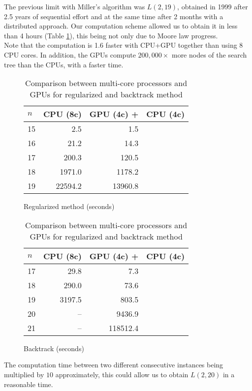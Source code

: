 The previous limit with Miller's algorithm was $L(2,19)$, obtained in 1999 after 2.5 years of sequential effort and at the same time after 2 months with a distributed approach\cite{Mil00}. 
Our computation scheme allowed us to obtain it in less than 4 hours (Table \ref{tab:result_base_regu}), this being not only due to Moore law progress.\\
Note that the computation is 1.6 faster with CPU+GPU together than using 8 CPU cores. 
In addition, the GPUs compute $200,000\times$ more nodes of the search tree than the CPUs, with a faster time.

\begin{table}[t!]
\begin{subfigure}[b]{0.5\linewidth}
\centering
\begin{tabular}{l r r r}
					\hline
					$n$ & CPU (8c) &  GPU (4c) +  &  \hspace*{-.8em}CPU (4c) \\
					\hline
					\hline
					15	& 2.5 & 1.5 & \\
					16  & 21.2 &14.3 & \\
					17  & 200.3 &120.5 &\\
					18  & 1971.0 &1178.2 &\\
					19  & 22594.2 & 13960.8 & \\ 
					\hline
\end{tabular}
\caption{Regularized method (seconds)}
\label{tab:result_base_regu}
\end{subfigure}
\begin{subfigure}[b]{0.5\linewidth}
\centering
\begin{tabular}{ l r r r }
					\hline
					$n$ & CPU (8c) &  GPU (4c) +  &  \hspace*{-.8em}CPU (4c) \\
					\hline
					\hline
					17  & 29.8 & 7.3&\\
					18  & 290.0 & 73.6&\\
					19  & 3197.5 & 803.5& \\
					20  & -- & 9436.9 &\\
					21  & -- & 118512.4& \\ 
					\hline
\end{tabular}	
\caption{Backtrack  (seconds)}
\label{tab:result_backtrack}
\end{subfigure}
\caption{Comparison between multi-core processors and GPUs for regularized and backtrack method}
\end{table}

The computation time between two different consecutive instances being multiplied by $10$ approximately, this could allow us to obtain $L(2,20)$ in a reasonable time.


